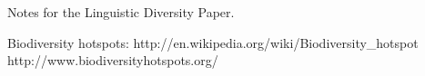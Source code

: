 Notes for the Linguistic Diversity Paper. 

Biodiversity hotspots:
http://en.wikipedia.org/wiki/Biodiversity_hotspot
http://www.biodiversityhotspots.org/